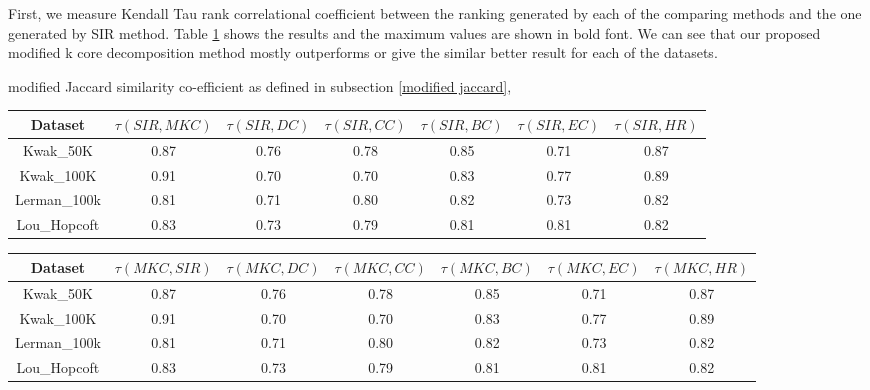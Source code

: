 \documentclass[sigconf]{acmart}
\begin{document}
First, we measure Kendall Tau rank correlational coefficient between the ranking generated by each of the comparing methods and the one generated by SIR method. Table \ref{Kendall Tau 1} shows the results and the maximum values are shown in bold font. We can see that our proposed modified k core decomposition method mostly outperforms or give the similar better result for each of the datasets. 

modified Jaccard similarity co-efficient as defined in subsection \ref{modified jaccard}, 


\begin{table}
	\label{Kendall Tau 1}
	\begin{adjustbox}{width={ .7\textwidth},totalheight={\textheight},keepaspectratio}%
	\begin{tabular}{|c|c|c|c|c|c|c|}
		\toprule
		Dataset &$\tau(SIR,MKC)$  &$\tau(SIR,DC)$ &$\tau(SIR,CC)$ &$\tau(SIR,BC)$ &$\tau(SIR,EC)$ &$\tau(SIR,HR)$\\
		\midrule
		Kwak\_50K & 0.87 & 0.76 & 0.78 & 0.85 & 0.71 & 0.87 \\
		\hline
		Kwak\_100K & 0.91 & 0.70 & 0.70 & 0.83 & 0.77 & 0.89 \\
		\hline
		Lerman\_100k& 0.81 & 0.71 & 0.80 & 0.82 & 0.73 & 0.82 \\
		\hline
		Lou\_Hopcoft& 0.83 & 0.73 & 0.79 & 0.81 & 0.81 & 0.82 \\
		\bottomrule
	\end{tabular}
	\end{adjustbox}
\end{table} 

\begin{table}
	\begin{adjustbox}{width={ .7\textwidth},totalheight={\textheight},keepaspectratio}%
		\begin{tabular}{|c|c|c|c|c|c|c|}
			\toprule
			Dataset &$\tau(MKC,SIR)$  &$\tau(MKC,DC)$ &$\tau(MKC,CC)$ &$\tau(MKC,BC)$  &$\tau(MKC,EC)$ &$\tau(MKC,HR)$\\
			\midrule
			Kwak\_50K & 0.87 & 0.76 & 0.78 & 0.85 & 0.71 & 0.87 \\
			\hline
			Kwak\_100K & 0.91 & 0.70 & 0.70 & 0.83 & 0.77 & 0.89 \\
			\hline
			Lerman\_100k& 0.81 & 0.71 & 0.80 & 0.82 & 0.73 & 0.82 \\
			\hline
			Lou\_Hopcoft& 0.83 & 0.73 & 0.79 & 0.81 & 0.81 & 0.82 \\
			\bottomrule
		\end{tabular}
	\end{adjustbox}
\end{table} 
\end{document}
